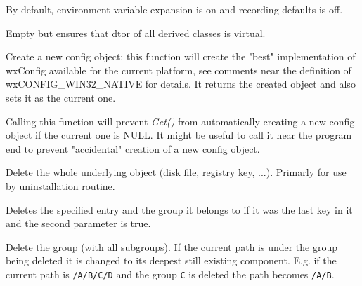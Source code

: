 
By default, environment variable expansion is on and recording defaults is
off.


\label{wxconfigbasedtor}


Empty but ensures that dtor of all derived classes is virtual.


\label{wxconfigbasecreate}


Create a new config object: this function will create the "best"
implementation of wxConfig available for the current platform, see comments
near the definition of wxCONFIG\_WIN32\_NATIVE for details. It returns the
created object and also sets it as the current one.


\label{wxconfigbasedontcreateondemand}


Calling this function will prevent {\it Get()} from automatically creating a
new config object if the current one is NULL. It might be useful to call it
near the program end to prevent "accidental" creation of a new config object.


\label{wxconfigbasedeleteall}


Delete the whole underlying object (disk file, registry key, ...). Primarly
for use by uninstallation routine.


\label{wxconfigbasedeleteentry}


Deletes the specified entry and the group it belongs to if it was the last key
in it and the second parameter is true.


\label{wxconfigbasedeletegroup}


Delete the group (with all subgroups). If the current path is under the group
being deleted it is changed to its deepest still existing component. E.g. if
the current path is \texttt{/A/B/C/D} and the group \texttt{C} is deleted the
path becomes \texttt{/A/B}.


